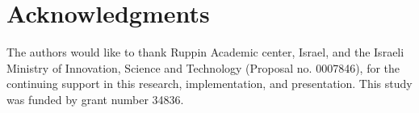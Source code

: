 \section*{Acknowledgments}
The authors would like to thank Ruppin Academic center, Israel, and the Israeli Ministry of Innovation, Science and Technology (Proposal no. 0007846), for the continuing support in this research, implementation, and presentation. This study was funded by grant number 34836.
